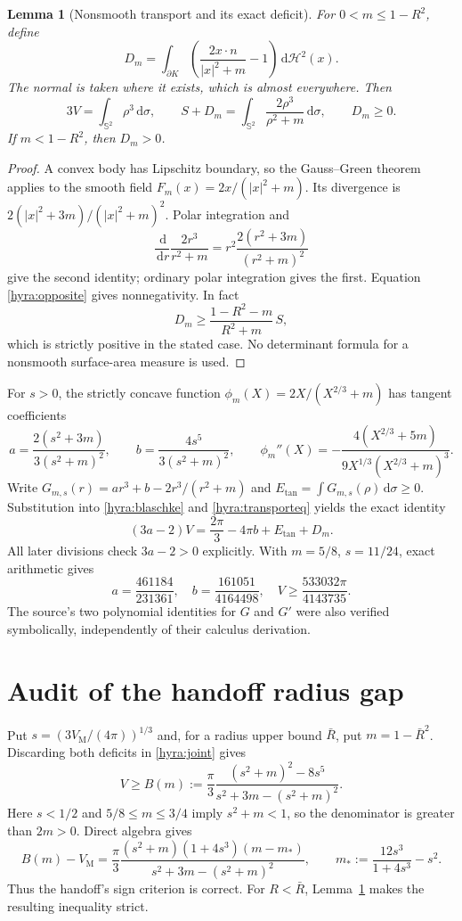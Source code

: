 \documentclass[11pt]{article}
\newtheorem{lemma}[theorem]{Lemma}
\theoremstyle{remark}\newtheorem{remark}[theorem]{Remark}
\newcommand{\Sph}{\mathbb S^2}
\newcommand{\VM}{V_{\mathrm M}}
\newcommand{\dd}{\,\mathrm d}
\newcommand{\Et}{E_{\mathrm{tan}}}
\begin{document}
\begin{lemma}[Nonsmooth transport and its exact deficit]\label{hyra:transport}
For $0<m\leq1-R^2$, define
\[
 D_m=\int_{\partial K}\left(\frac{2x\cdot n}{|x|^2+m}-1\right)\dd\mathcal H^2(x).
\]
The normal is taken where it exists, which is almost everywhere. Then
\begin{equation}\label{hyra:transporteq}
 3V=\int_{\Sph}\rho^3\dd\sigma,\qquad
 S+D_m=\int_{\Sph}\frac{2\rho^3}{\rho^2+m}\dd\sigma,\qquad D_m\geq0.
\end{equation}
If $m<1-R^2$, then $D_m>0$.
\end{lemma}
\begin{proof}
A convex body has Lipschitz boundary, so the Gauss--Green theorem applies to the smooth field $F_m(x)=2x/(|x|^2+m)$. Its divergence is $2(|x|^2+3m)/(|x|^2+m)^2$. Polar integration and
\[
 \frac{\dd}{\dd r}\frac{2r^3}{r^2+m}
 =r^2\frac{2(r^2+3m)}{(r^2+m)^2}
\]
give the second identity; ordinary polar integration gives the first. Equation \eqref{hyra:opposite} gives nonnegativity. In fact
\[
 D_m\geq\frac{1-R^2-m}{R^2+m}\,S,
\]
which is strictly positive in the stated case. No determinant formula for a nonsmooth surface-area measure is used.
\end{proof}

For $s>0$, the strictly concave function $\phi_m(X)=2X/(X^{2/3}+m)$ has tangent coefficients
\[
 a=\frac{2(s^2+3m)}{3(s^2+m)^2},\qquad
 b=\frac{4s^5}{3(s^2+m)^2},\qquad
 \phi_m''(X)=-\frac{4(X^{2/3}+5m)}{9X^{1/3}(X^{2/3}+m)^3}.
\]
Write $G_{m,s}(r)=ar^3+b-2r^3/(r^2+m)$ and $\Et=\int G_{m,s}(\rho)\dd\sigma\geq0$. Substitution into \eqref{hyra:blaschke} and \eqref{hyra:transporteq} yields the exact identity
\begin{equation}\label{hyra:joint}
 (3a-2)V=\frac{2\pi}{3}-4\pi b+\Et+D_m.
\end{equation}
All later divisions check $3a-2>0$ explicitly. With $m=5/8$, $s=11/24$, exact arithmetic gives
\[
 a=\frac{461184}{231361},\quad b=\frac{161051}{4164498},\quad
 V\geq\frac{533032\pi}{4143735}.
\]
The source's two polynomial identities for $G$ and $G'$ were also verified symbolically, independently of their calculus derivation.

\section{Audit of the handoff radius gap}
Put $s=(3\VM/(4\pi))^{1/3}$ and, for a radius upper bound $\bar R$, put $m=1-\bar R^2$. Discarding both deficits in \eqref{hyra:joint} gives
\begin{equation}\label{hyra:B}
 V\geq B(m):=\frac\pi3\frac{(s^2+m)^2-8s^5}{s^2+3m-(s^2+m)^2}.
\end{equation}
Here $s<1/2$ and $5/8\leq m\leq3/4$ imply $s^2+m<1$, so the denominator is greater than $2m>0$. Direct algebra gives
\begin{equation}\label{hyra:factor}
 B(m)-\VM=\frac\pi3\frac{(s^2+m)(1+4s^3)(m-m_*)}{s^2+3m-(s^2+m)^2},
 \qquad m_*:=\frac{12s^3}{1+4s^3}-s^2.
\end{equation}
Thus the handoff's sign criterion is correct. For $R<\bar R$, Lemma~\ref{hyra:transport} makes the resulting inequality strict.
\end{document}

